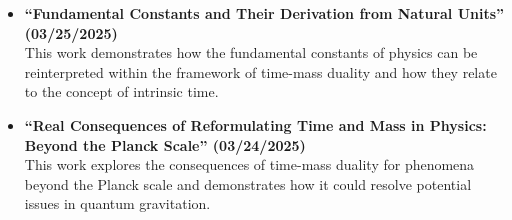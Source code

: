 \documentclass{article}
\begin{document}
\begin{itemize}
		\item \textbf{``Fundamental Constants and Their Derivation from Natural Units'' (03/25/2025)} \\
		This work demonstrates how the fundamental constants of physics can be reinterpreted within the framework of time-mass duality and how they relate to the concept of intrinsic time.
		
		\item \textbf{``Real Consequences of Reformulating Time and Mass in Physics: Beyond the Planck Scale'' (03/24/2025)} \\
		This work explores the consequences of time-mass duality for phenomena beyond the Planck scale and demonstrates how it could resolve potential issues in quantum gravitation.
	\end{itemize}
	
\end{document}
